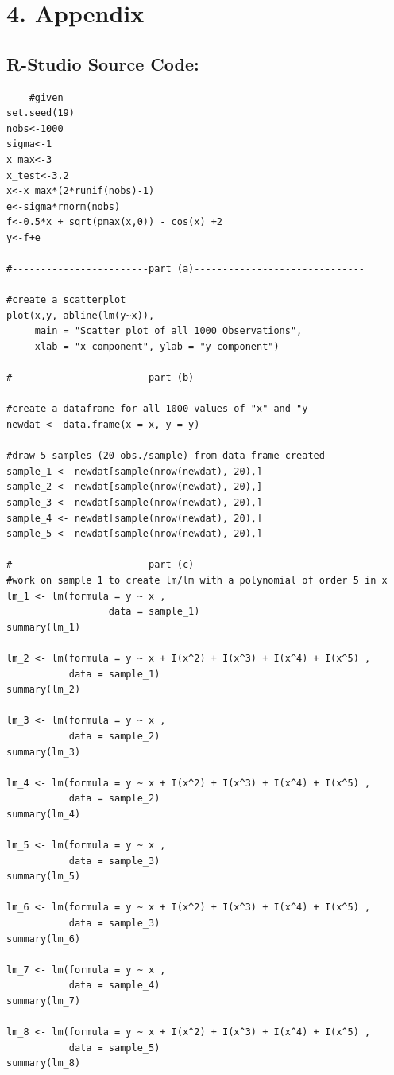 \documentclass{article}
\begin{document}
\newpage
\section{4. \space Appendix}
\subsection*{R-Studio Source Code:}
\begin{verbatim}
    #given
set.seed(19)
nobs<-1000
sigma<-1
x_max<-3
x_test<-3.2
x<-x_max*(2*runif(nobs)-1)
e<-sigma*rnorm(nobs)
f<-0.5*x + sqrt(pmax(x,0)) - cos(x) +2
y<-f+e

#------------------------part (a)------------------------------

#create a scatterplot
plot(x,y, abline(lm(y~x)), 
     main = "Scatter plot of all 1000 Observations",
     xlab = "x-component", ylab = "y-component")

#------------------------part (b)------------------------------

#create a dataframe for all 1000 values of "x" and "y
newdat <- data.frame(x = x, y = y)

#draw 5 samples (20 obs./sample) from data frame created 
sample_1 <- newdat[sample(nrow(newdat), 20),]
sample_2 <- newdat[sample(nrow(newdat), 20),]
sample_3 <- newdat[sample(nrow(newdat), 20),]
sample_4 <- newdat[sample(nrow(newdat), 20),]
sample_5 <- newdat[sample(nrow(newdat), 20),]

#------------------------part (c)---------------------------------
#work on sample 1 to create lm/lm with a polynomial of order 5 in x
lm_1 <- lm(formula = y ~ x ,
                  data = sample_1)
summary(lm_1)

lm_2 <- lm(formula = y ~ x + I(x^2) + I(x^3) + I(x^4) + I(x^5) ,
           data = sample_1)
summary(lm_2)

lm_3 <- lm(formula = y ~ x ,
           data = sample_2)
summary(lm_3)

lm_4 <- lm(formula = y ~ x + I(x^2) + I(x^3) + I(x^4) + I(x^5) ,
           data = sample_2)
summary(lm_4)

lm_5 <- lm(formula = y ~ x ,
           data = sample_3)
summary(lm_5)

lm_6 <- lm(formula = y ~ x + I(x^2) + I(x^3) + I(x^4) + I(x^5) ,
           data = sample_3)
summary(lm_6)

lm_7 <- lm(formula = y ~ x ,
           data = sample_4)
summary(lm_7)

lm_8 <- lm(formula = y ~ x + I(x^2) + I(x^3) + I(x^4) + I(x^5) ,
           data = sample_5)
summary(lm_8)


\end{verbatim}
\end{document}

